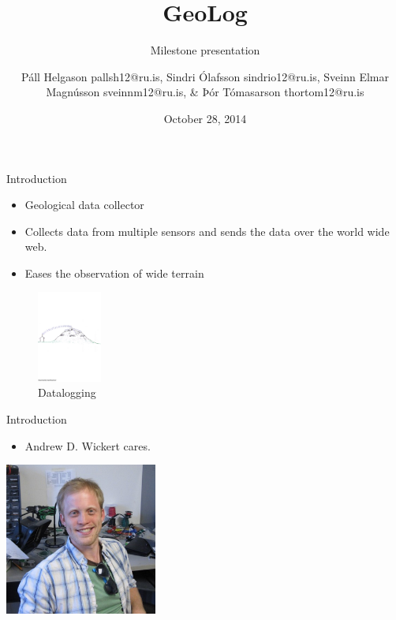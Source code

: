 \documentclass{beamer}
\title{GeoLog}
\subtitle{Milestone presentation}
\author[P. Helgasson, S. Ólafsson, S. Magnússon, \& Þ. Tómasarson]{Páll Helgason pallsh12@ru.is, Sindri Ólafsson sindrio12@ru.is, Sveinn Elmar Magnússon sveinnm12@ru.is, \& Þór Tómasarson thortom12@ru.is}
\institute[RU]{
  Department of Science and Engineering (TVD) \\
  Reykjavík University \\
}
\date{October 28, 2014} %
\begin{document}
\begin{frame}[plain]
  \titlepage
\end{frame}

\begin{frame}{Introduction}
	\begin{itemize}
	\item Geological data collector
	\item Collects data from multiple sensors and sends the data over the world wide web. 
	\item Eases the observation of wide terrain
	\end{itemize}
	\begin{figure}
			\centering
	        \includegraphics[height=3cm]{graphics/GeoLog}
	        \caption{Datalogging\cite{Helgason2014}}
	\end{figure}
\end{frame}

\begin{frame}{Introduction}
\begin{itemize}
\item Andrew D. Wickert cares.
\end{itemize}
\centering
\includegraphics[height=5cm]{graphics/andrewWickert.png}
\cite{andrewWickert}
\end{frame}
\end{document}
